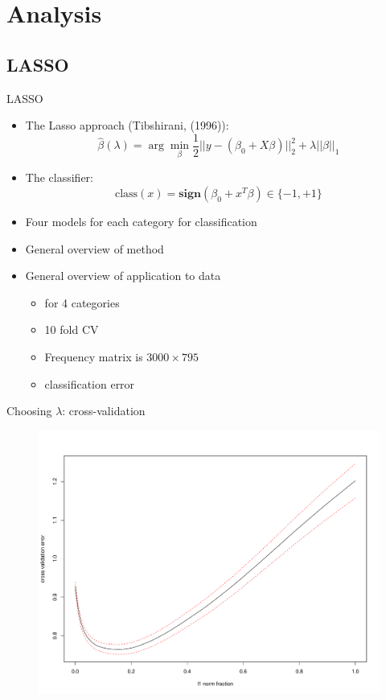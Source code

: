 \documentclass[12pt, trans]{beamer}
\newcommand{\1}[1]{{\mathbf 1}\left\{#1\right\}}        %
\begin{document}
\clearpage 
\section{Analysis}


\subsection{LASSO}

\begin{frame}[fragile]{LASSO}
\begin{itemize}[<+->]

\item The Lasso approach (Tibshirani, (1996)):
\[
\hat{\beta}(\lambda) = \arg \min_\beta \frac{1}{2}||y-(\beta_0+X\beta)||_2^2 + \lambda ||\beta||_1
\]
\item The classifier:
\[
\text{class}(x) = \textbf{sign}(\beta_0+x^T\beta)\in\{-1,+1\}
\]

\item Four models for each category for classification
\item General overview of method
\item General overview of application to data
	\begin{itemize}
	\item for 4 categories
	\item 10 fold CV
	\item Frequency matrix is $3000 \times 795$
	\item classification error
	\end{itemize}
	
\end{itemize}

\end{frame}

\begin{frame}{Choosing $\lambda$: cross-validation}

\begin{figure}
  \centering
  \includegraphics[height=0.9\textheight]{./../../lassoResults/CVPosErr.pdf} 
\end{figure}

\end{frame}
\end{document}
